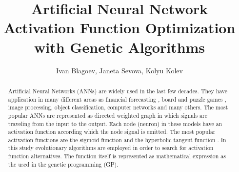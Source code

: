 \documentclass{llncs}
\begin{document}
\title{Artificial Neural Network Activation Function Optimization with Genetic Algorithms}

\author{Ivan Blagoev, Janeta Sevova, Kolyu Kolev}



\maketitle


\begin{abstract}

Artificial Neural Networks (ANNs) are widely used in the last few decades. They have application in many different areas as financial forecasting \cite{atanasova01,atanasova02,balabanov04,tomov01}, board and puzzle games \cite{balabanov01,balabanov03,keremedchiev01}, image processing, object classification, computer networks \cite{tashev01,tashev02} and many others. The most popular ANNs are represented as directed weighted graph in which signals are traveling from the input to the output. Each node (neuron) in these models have an activation function according which the node signal is emitted. The most popular activation functions are the sigmoid function and the hyperbolic tangent function \cite{zankinski01,balabanov02}. In this study evolutionary algorithms are employed in order to search for activation function alternatives. The function itself is represented as mathematical expression as the used in the genetic programming (GP).

\end{abstract}
\end{document}
